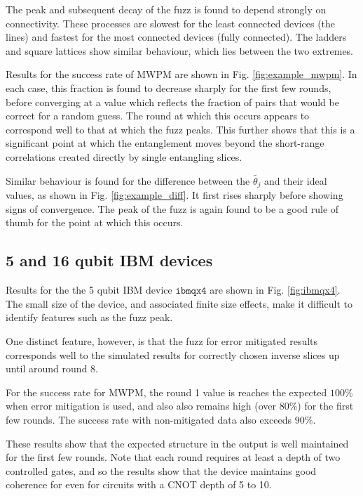 \documentclass[aps,prl,twocolumn,showpacs,preprintnumbers]{revtex4-1}
\begin{document}
The peak and subsequent decay of the fuzz is found to depend strongly on connectivity. These processes are slowest for the least connected devices (the lines) and fastest for the most connected devices (fully connected). The ladders and square lattices show similar behaviour, which lies between the two extremes.

Results for the success rate of MWPM are shown in Fig. \ref{fig:example_mwpm}. In each case, this fraction is found to decrease sharply for the first few rounds, before converging at a value which reflects the fraction of pairs that would be correct for a random guess. The round at which this occurs appears to correspond well to that at which the fuzz peaks. This further shows that this is a significant point at which the entanglement moves beyond the short-range correlations created directly by single entangling slices.

Similar behaviour is found for the difference between the $\tilde{\theta_j}$ and their ideal values, as shown in Fig. \ref{fig:example_diff}. It first rises sharply before showing signs of convergence. The peak of the fuzz is again found to be a good rule of thumb for the point at which this occurs.

\subsection{5 and 16 qubit IBM devices}  \label{subsec:ibm}

Results for the the 5 qubit IBM device $\mathtt{ibmqx4}$ are shown in Fig. \ref{fig:ibmqx4}. The small size of the device, and associated finite size effects, make it difficult to identify features such as the fuzz peak. 

One distinct feature, however, is that the fuzz for error mitigated results corresponds well to the simulated results for correctly chosen inverse slices up until around round 8.

For the success rate for MWPM, the round 1 value is reaches the expected $100\%$ when error mitigation is used, and also also remains high (over $80\%$) for the first few rounds. The success rate with non-mitigated data also exceeds $90\%$.

These results show that the expected structure in the output is well maintained for the first few rounds. Note that each round requires at least a depth of two controlled gates, and so the results show that the device maintains good coherence for even for circuits with a CNOT depth of 5 to 10.
\end{document}

